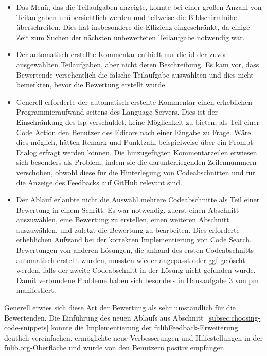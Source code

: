\begin{itemize}
    \item Das Menü, das die Teilaufgaben anzeigte, konnte bei einer großen Anzahl von Teilaufgaben unübersichtlich werden und teilweise die Bildschirmhöhe überschreiten.
    Dies hat insbesondere die Effizienz eingeschränkt, da einige Zeit zum Suchen der nächsten unbewerteten Teilaufgabe notwendig war.
    \item Der automatisch erstellte Kommentar enthielt nur die \ac{id} der zuvor ausgewählten Teilaufgaben, aber nicht deren Beschreibung.
    Es kam vor, dass Bewertende versehentlich die falsche Teilaufgabe auswählten und dies nicht bemerkten, bevor die Bewertung erstellt wurde.
    \item Generell erforderte der automatisch erstellte Kommentar einen erheblichen Programmieraufwand seitens des Language Servers.
    Dies ist der Einschränkung des \ac{lsp} verschuldet, keine Möglichkeit zu bieten, als Teil einer Code Action den Benutzer des Editors nach einer Eingabe zu Frage.
    Wäre dies möglich, hätten Remark und Punktzahl beispielweise über ein Prompt-Dialog erfragt werden können.
    Die hinzugefügten Kommentarzeilen erwiesen sich besonders als Problem, indem sie die darunterliegenden Zeilennummern verschoben, obwohl diese für die Hinterlegung von Codeabschnitten und für die Anzeige des Feedbacks auf GitHub relevant sind.
    \item Der Ablauf erlaubte nicht die Auswahl mehrere Codeabschnitte als Teil einer Bewertung in einem Schritt.
    Es war notwendig, zuerst einen Abschnitt auszuwählen, eine Bewertung zu erstellen, einen weiteren Abschnitt auszuwählen, und zuletzt die Bewertung zu bearbeiten.
    Dies erforderte erheblichen Aufwand bei der korrekten Implementierung von Code Search.
    Bewertungen von anderen Lösungen, die anhand des ersten Codeabschnitts automatisch erstellt wurden, mussten wieder angepasst oder \ac{ggf} gelöscht werden, falls der zweite Codeabschnitt in der Lösung nicht gefunden wurde.
    Damit verbundene Probleme haben sich besonders in Hausaufgabe 3 von \ac{pm} manifestiert.
\end{itemize}

Generell erwies sich diese Art der Bewertung als sehr umständlich für die Bewertenden.
Die Einführung des neuen Ablaufs aus Abschnitt~\ref{subsec:choosing-code-snippets} konnte die Implementierung der fulibFeedback-Erweiterung deutlich vereinfachen, ermöglichte neue Verbesserungen und Hilfestellungen in der fulib.org-Oberfläche und wurde von den Benutzern positiv empfangen.

